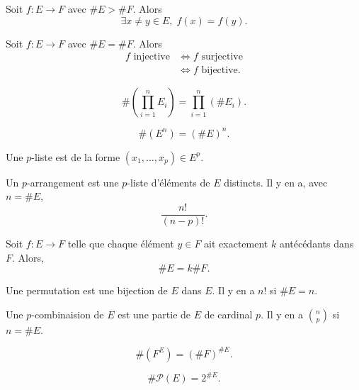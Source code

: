 \begin{multicols}{2}
	\begin{recap-box}[frametitle={Principe des tiroirs}]
		Soit $f: E \to F$ avec $\#E > \#F$. Alors \[
			\exists x\neq y \in E,\;f(x) = f(y)
		.\]
	\end{recap-box}
	\begin{recap-box}
		Soit $f : E \to F$ avec $\#E = \#F$. Alors
		\begin{align*}
			f \text{ injective} &\iff f \text{ surjective}\\
			&\iff f \text{ bijective}.
		\end{align*}
	\end{recap-box}
	\begin{recap-box}
		\[
			\#\left( \prod_{i=1}^{n} E_i \right) = \prod_{i=1}^{n} (\#E_i).
		\]
	\end{recap-box}
	\begin{recap-box}
		\[
			\#(E^n) = (\#E)^n
		.\]
	\end{recap-box}
	\begin{recap-box}
		Une $p$-liste est de la forme $(x_1, \ldots, x_p) \in E^p$.\\
	\end{recap-box}
	\begin{recap-box}
		Un $p$-arrangement est une $p$-liste d'éléments de $E$ distincts. Il y en a, avec $n = \#E$, \[
			\frac{n!}{(n-p)!}
		.\]
	\end{recap-box}
	\begin{recap-box}[frametitle={Principe des bergers}]
		Soit $f : E\to F$ telle que chaque élément $y \in F$ ait exactement $k$ antécédants dans $F$. Alors, \[
			\#E = k\#F
		.\] 
	\end{recap-box}
	\begin{recap-box}
		Une permutation est une bijection de $E$ dans $E$. Il y en a $n!$ si $\#E = n$.
	\end{recap-box}
	\begin{recap-box}
		Une $p$-combinaision de $E$ est une partie de $E$ de cardinal $p$. Il y en a ${n\choose p}$ si $n = \#E$.
	\end{recap-box}
	\begin{recap-box}
		\[
			\#(F^E) = (\#F)^{\#E}
		.\]
	\end{recap-box}
	\begin{recap-box}
		\[
			\#\mathcal{P}(E) = 2^{\#E}
		.\]
	\end{recap-box}
\end{multicols}

